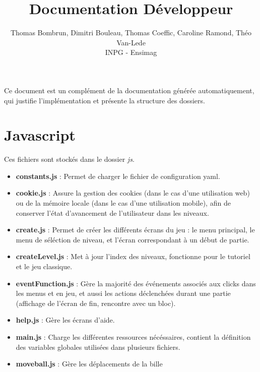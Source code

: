 \documentclass[11pt]{article}
\begin{document}
\title{Documentation Développeur}
\author{Thomas Bombrun, Dimitri Bouleau, Thomas Coeffic, Caroline Ramond, Théo Van-Lede\\
INPG - Ensimag}
\renewcommand{\today}{17 Juin 2014}
\maketitle
Ce document est un complément de la documentation générée automatiquement, 
qui justifie l'implémentation et présente la structure des dossiers.

\section {Javascript}
Ces fichiers sont stockés dans le dossier {\em js}.
\begin{itemize}
	\item
		\textbf{constants.js} : Permet de charger le fichier de 
		configuration yaml.\\
	\item
		\textbf{cookie.js} : Assure la gestion des cookies (dans le
		cas d'une utilisation web) ou de la mémoire locale (dans 
		le cas d'une utilisation mobile), afin de conserver l'état 
		d'avancement de l'utilisateur dans les niveaux.\\
	\item
		\textbf{create.js} : Permet de créer les différents écrans du
		jeu : le menu principal, le menu de séléction de niveau, et 
		l'écran correspondant à un début de partie.\\
	\item
		\textbf{createLevel.js} : Met à jour l'index des niveaux, 
		fonctionne pour le tutoriel et le jeu classique.\\
	\item
		\textbf{eventFunction.js} : Gère la majorité des événements 
		associés aux clicks dans les menus et en jeu, et aussi les 
		actions déclenchées durant une partie (affichage de l'écran de 
		fin, rencontre avec un bloc).\\
	\item
		\textbf{help.js} : Gère les écrans d'aide.\\
	\item
		\textbf{main.js} : Charge les différentes ressources 
		nécéssaires, contient la définition des variables globales 
		utilisées dans plusieurs fichiers.\\
	\item
		\textbf{moveball.js} : Gère les déplacements de la bille 

\end{itemize}
\end{document}
